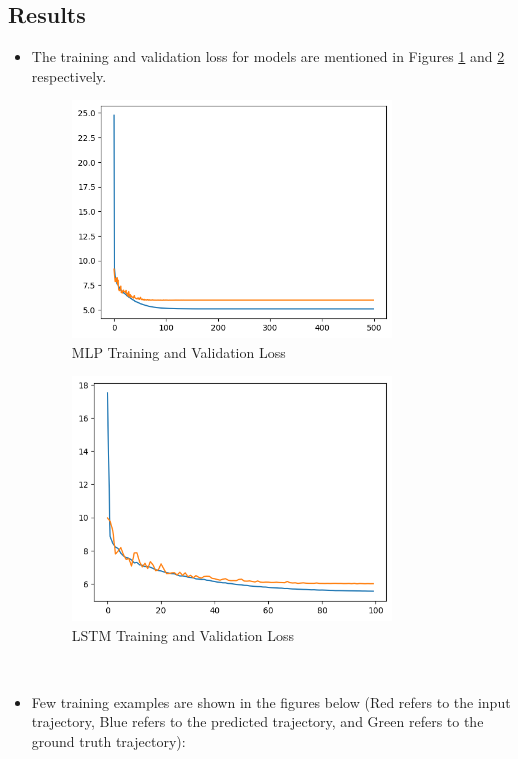 \documentclass{article}
\begin{document}
\subsection{Results}
\begin{itemize}
  \item The training and validation loss for models are mentioned in Figures \ref{fig:mlp_error} and \ref{fig:lstm_error} respectively.
  \begin{figure}[h]
    \centering
    \includegraphics[width=0.8\textwidth]{mlp_error.png}
    \caption{MLP Training and Validation Loss}
    \label{fig:mlp_error}
  \end{figure}
  \begin{figure}[h]
    \centering
    \includegraphics[width=0.8\textwidth]{lstm_error.png}
    \caption{LSTM Training and Validation Loss}
    \label{fig:lstm_error}
  \end{figure} \\
  \item Few training examples are shown in the figures below (Red refers to the input trajectory, Blue refers to the predicted trajectory, and Green refers to the ground truth trajectory):

\end{itemize}
\end{document}
